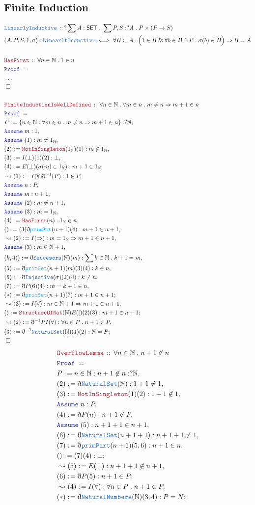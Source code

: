 \documentclass[12pt]{scrartcl}
\newcommand{\TYPE}[1]{\textcolor{NavyBlue}{\mathtt{#1}}}
\newcommand{\FUNC}[1]{\textcolor{Cerulean}{\mathtt{#1}}}
\newcommand{\LOGIC}[1]{\textcolor{Blue}{\mathtt{#1}}}
\newcommand{\THM}[1]{\textcolor{Maroon}{\mathtt{#1}}}
\renewcommand{\.}{\; . \;}
\newcommand{\de}{: \kern 0.1pc =}
\newcommand{\Theorem}[2]{& \THM{#1} \, :: \, #2 \\ & \Proof = \\ }
\newcommand{\DeclareType}[2]{& \TYPE{#1} \, :: \, #2 \\}
\newcommand{\DefineType}[3]{& #1 : \TYPE{#2} \iff #3 \\}
\newcommand{\Page}[1]{ \begin{align*} #1 \end{align*}   }
\newcommand{ \bd }{ \ByDef }
\newcommand{\NoProof}{ & \ldots \\ \EndProof}
\renewcommand{\And}{\; \& \;}
\newcommand{\Nat}{\mathbb{N} }
\newcommand{\Say}[3]{& #1 \de #2 : #3, \\}
\newcommand{\Conclude}[3]{& #1 \de #2 : #3; \\}
\newcommand{\Derive}[3]{& \leadsto #1 \de #2 : #3, \\}
\newcommand{\Assume}[2]{& \LOGIC{Assume} \; #1 : #2, \\}
\newcommand{\QED}{\; \square}
\newcommand{\EndProof}{& \QED \\}
\newcommand{\ByDef}{\eth}
\newcommand{\Proof}{\LOGIC{Proof} \; }
\newcommand{\SET}{\mathsf{SET}}
\begin{document}
\subsection{Finite Induction}
\Page{  
	\DeclareType{LinearlyInductive}{?\sum A : \SET \. \sum P,S : ?A \. P \times (P \to S)}
	\DefineType{(A,P,S,1,\sigma)}{LinearltInductive}{\forall B \subset A \. 
		\Big(1 \in B \And \forall b \in B \cap P \. \sigma(b) \in B \Big) \Rightarrow B = A }
	\\
	\Theorem{HasFirst}{\forall n \in \Nat \. 1 \in n}
	\NoProof
	\\
	\Theorem{FiniteInductionIsWellDefined}{\forall n \in \Nat \. \forall m \in n \. m \neq n \Rightarrow m + 1 \in n }
	\Say{P}{\{ n \in \Nat : \forall m \in n \. m \neq n \Rightarrow m + 1 \in n\}}{?\Nat}
	\Assume{m}{1}
	\Assume{(1)}{m \neq 1_\Nat}
	\Say{(2)}{\THM{NotInSingleton}(1_\Nat)(1)}{m \not \in 1_\Nat}
	\Say{(3)}{I(\bot)(1)(2)}{\bot}
	\Conclude{(4)}{E(\bot)(\sigma(m) \in 1_\Nat)}{m + 1 \in 1_\Nat}
	\Derive{(1)}{I(\forall)\bd^{-1}(P)}{1 \in P}
	\Assume{n}{P}
	\Assume{m}{n + 1}
	\Assume{(2)}{m \neq n + 1}
	\Assume{(3)}{m = 1_\Nat}
	\Say{(4)}{\THM{HasFirst}(n)}{ 1_\Nat \in n  }
	\Conclude{()}{(3)\bd \FUNC{primSet}(n+1)(4)}{ m + 1  \in n + 1   }
	\Derive{(2)}{I(\Rightarrow)}{m = 1_\Nat \Rightarrow m + 1 \in n + 1}
	\Assume{(3)}{m \in \Nat + 1}
	\Say{(k,4))}{\bd \TYPE{Succesors}(\Nat)(m)}{\sum k \in \Nat \. k + 1 = m}
	\Say{(5)}{\bd \FUNC{primSet}(n + 1)(m)(3)(4)}{ k \in n}
	\Say{(6)}{\bd \TYPE{Injective}(\sigma)(2)(4)}{k  \neq n}
	\Say{(7)}{\bd P (6)(4) }{ m = k + 1 \in n }
	\Conclude{(*)}{\bd \FUNC{primSet}(n + 1)(7)}{ m + 1 \in n + 1  }
	\Derive{(3)}{I(\forall)}{m \in \Nat + 1 \Rightarrow m + 1 \in n + 1}
	\Conclude{()}{\THM{StructureOfNat}(\Nat)E(|)(2)(3)}{m + 1 \in n + 1}
	\Derive{(2)}{\bd^{-1} P I(\forall)}{\forall n \in P \. n + 1 \in P}
	\Conclude{(3)}{\bd^{-1} \TYPE{NaturalSet}(\Nat)(1)(2)}{\Nat = P}
	\EndProof
}\Page{
	\Theorem{OverflowLemma}{\forall n \in \Nat \. n + 1 \not \in n}
	\Say{P}{n \in \Nat : n + 1 \not \in n}{?\Nat}
	\Say{(2)}{\bd \TYPE{NaturalSet}(\Nat)}{1 + 1 \neq 1}
	\Say{(3)}{  \THM{NotInSingleton}(1)(2)}{1 + 1 \not \in 1}
	\Assume{n}{P}
	\Say{(4)}{\bd P(n)}{n + 1 \not \in P}
	\Assume{(5)}{n + 1 + 1 \in n + 1 }
	\Say{(6)}{\bd \TYPE{NaturalSet}(n + 1 + 1)}{ n + 1 + 1 \neq 1}
	\Say{(7)}{\bd \TYPE{primPart}(n + 1)(5,6) }{n + 1 \in n}
	\Conclude{()}{(7)(4)}{\bot}
	\Derive{(5)}{E(\bot)}{n + 1 + 1 \not \in n + 1}
	\Conclude{(6)}{\bd P (5)}{n + 1 \in P}
	\Derive{(4)}{I(\forall)}{\forall n \in P \. n  + 1 \in P}
	\Conclude{(*)}{\bd \TYPE{NaturalNumbers}(\Nat)(3,4)}{P = N}
}
\end{document}
